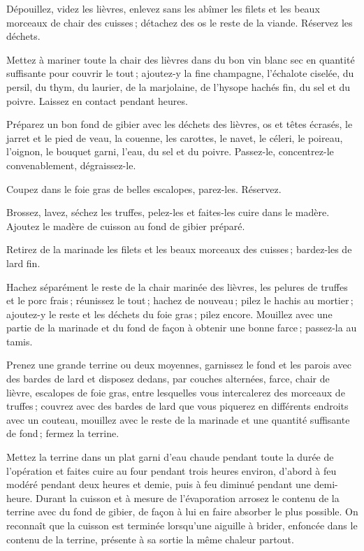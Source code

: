Dépouillez, videz les lièvres, enlevez sans les abîmer les filets et les beaux
morceaux de chair des cuisses ; détachez des os le reste de la viande. Réservez
les déchets.

Mettez à mariner toute la chair des lièvres dans du bon vin blanc sec en
quantité suffisante pour couvrir le tout ; ajoutez-y la fine champagne,
l'échalote ciselée, du persil, du thym, du laurier, de la marjolaine, de
l'hysope hachés fin, du sel et du poivre. Laissez en contact pendant
{\mmm} heures.

Préparez un bon fond de gibier avec les déchets des lièvres, os et têtes
écrasés, le jarret et le pied de veau, la couenne, les carottes, le navet, le
céleri, le poireau, l'oignon, le bouquet garni, l’eau, du sel et du poivre.
Passez-le, concentrez-le convenablement, dégraissez-le.

Coupez dans le foie gras de belles escalopes, parez-les. Réservez.

Brossez, lavez, séchez les truffes, pelez-les et faites-les cuire dans le
madère. Ajoutez le madère de cuisson au fond de gibier préparé.

Retirez de la marinade les filets et les beaux morceaux des cuisses ;
bardez-les de lard fin.

Hachez séparément le reste de la chair marinée des lièvres, les pelures de
truffes et le porc frais ; réunissez le tout ; hachez de nouveau ; pilez le
hachis au mortier ; ajoutez-y le reste et les déchets du foie gras ; pilez
encore. Mouillez avec une partie de la marinade et du fond de façon à obtenir
une bonne farce ; passez-la au tamis.

Prenez une grande terrine ou deux moyennes, garnissez le fond et les parois
avec des bardes de lard et disposez dedans, par couches alternées, farce, chair
de lièvre, escalopes de foie gras, entre lesquelles vous intercalerez des
morceaux de truffes ; couvrez avec des bardes de lard que vous piquerez en
différents endroits avec un couteau, mouillez avec le reste de la marinade et
une quantité suffisante de fond ; fermez la terrine.

Mettez la terrine dans un plat garni d'eau chaude pendant toute la durée
de l'opération et faites cuire au four pendant trois heures environ, d'abord
à feu modéré pendant deux heures et demie, puis à feu diminué pendant une
demi-heure. Durant la cuisson et à mesure de l'évaporation arrosez le contenu
de la terrine avec du fond de gibier, de façon à lui en faire absorber le plus
possible. On reconnaît que la cuisson est terminée lorsqu'une aiguille à brider,
enfoncée dans le contenu de la terrine, présente à sa sortie la même chaleur
partout.

